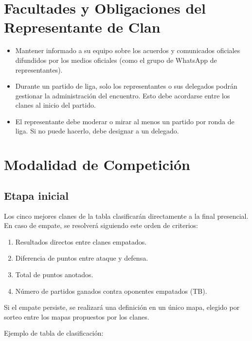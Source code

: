 \documentclass[a4paper, 11pt]{article}
\begin{document}
    \section{Facultades y Obligaciones del Representante de Clan}
    
    \begin{itemize}
        \item Mantener informado a su equipo sobre los acuerdos y comunicados oficiales difundidos por los medios oficiales (como el grupo de WhatsApp de representantes).
        \item Durante un partido de liga, solo los representantes o sus delegados podrán gestionar la administración del encuentro. Esto debe acordarse entre los clanes al inicio del partido.
        \item El representante debe moderar o mirar al menos un partido por ronda de liga. Si no puede hacerlo, debe designar a un delegado.
    \end{itemize}

    \clearpage

    \section{Modalidad de Competición}

    \subsection{Etapa inicial}

    Los cinco mejores clanes de la tabla clasificarán directamente a la final presencial.
    En caso de empate, se resolverá siguiendo este orden de criterios:

    \begin{enumerate}
        \item  Resultados directos entre clanes empatados.
        \item  Diferencia de puntos entre ataque y defensa.
        \item  Total de puntos anotados.
        \item  Número de partidos ganados contra oponentes empatados (TB).
    \end{enumerate}
   
    Si el empate persiste, se realizará una definición en un único mapa, elegido por sorteo entre los mapas propuestos por los clanes.\par
    Ejemplo de tabla de clasificación:
\end{document}
